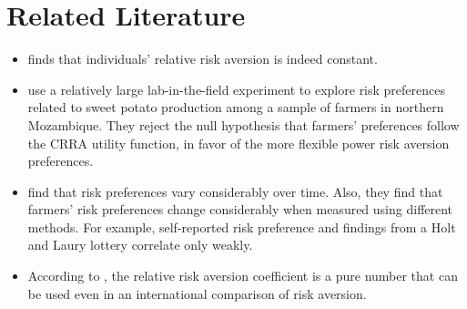 \documentclass[12pt]{article}
\begin{document}
\section{Related Literature}
\begin{itemize}
    \item \cite{chiappori2011relative} finds that individuals’ relative risk aversion is indeed constant. 
    
    \item \cite{de2014measuring} use a relatively large lab-in-the-field experiment to explore risk preferences related to sweet potato production among a sample of farmers in northern Mozambique. They reject the null hypothesis that farmers' preferences follow the CRRA utility function, in favor of the more flexible power risk aversion preferences. 

    \item \cite{finger2023stability} find that risk preferences vary considerably over time. Also, they find that farmers' risk preferences change considerably when measured using different methods. For example, self-reported risk preference and findings from a Holt and Laury lottery correlate only weakly. 
    
    \item According to \cite{hardaker2000some}, the relative risk aversion coefficient is a pure number that can be used even in an international comparison of risk aversion.
\end{itemize}

\newpage

\end{document}
